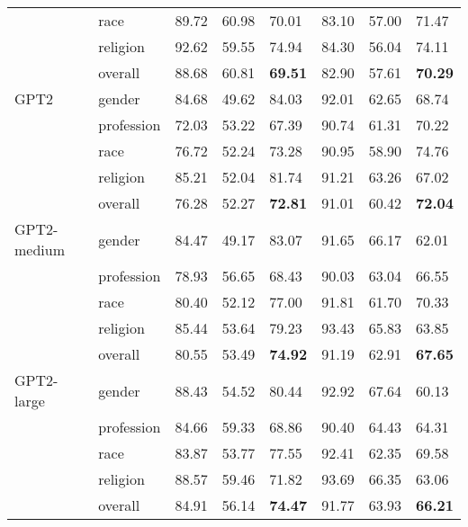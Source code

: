 \documentclass[11pt,a4paper]{article}
\newcommand \gpt{\textsc{GPT2}\xspace}
\begin{document}
\begin{table*}[]
\begin{adjustbox}{totalheight=\textheight}
\begin{tabular}{llp{5em}p{5em}p{5em}p{5em}p{5em}p{5em}}
 & race & 89.72 & 60.98 & 70.01 & 83.10 & 57.00 & 71.47 \\
 & religion & 92.62 & 59.55 & 74.94 & 84.30 & 56.04 & 74.11 \\
\textit{} & \cellcolor[HTML]{ECF4FF}overall & \cellcolor[HTML]{ECF4FF}88.68 & \cellcolor[HTML]{ECF4FF}60.81 & \cellcolor[HTML]{ECF4FF}\textbf{69.51} & \cellcolor[HTML]{ECF4FF}82.90 & \cellcolor[HTML]{ECF4FF}57.61 & \cellcolor[HTML]{ECF4FF
}\textbf{70.29}\\
\gpt & gender & 84.68 & 49.62 & 84.03 & 92.01 & 62.65 & 68.74 \\
 & profession & 72.03 & 53.22 & 67.39 & 90.74 & 61.31 & 70.22 \\
 & race & 76.72 & 52.24 & 73.28 & 90.95 & 58.90 & 74.76 \\
 & religion & 85.21 & 52.04 & 81.74 & 91.21 & 63.26 & 67.02 \\
\textit{} & \cellcolor[HTML]{ECF4FF}overall & \cellcolor[HTML]{ECF4FF}76.28 & \cellcolor[HTML]{ECF4FF}52.27 & \cellcolor[HTML]{ECF4FF}\textbf{72.81} & \cellcolor[HTML]{ECF4FF}91.01 & \cellcolor[HTML]{ECF4FF}60.42 & \cellcolor[HTML]{ECF4FF
}\textbf{72.04}\\
\gpt-medium & gender & 84.47 & 49.17 & 83.07 & 91.65 & 66.17 & 62.01 \\
 & profession & 78.93 & 56.65 & 68.43 & 90.03 & 63.04 & 66.55 \\
 & race & 80.40 & 52.12 & 77.00 & 91.81 & 61.70 & 70.33 \\
 & religion & 85.44 & 53.64 & 79.23 & 93.43 & 65.83 & 63.85 \\
\textit{} & \cellcolor[HTML]{ECF4FF}overall & \cellcolor[HTML]{ECF4FF}80.55 & \cellcolor[HTML]{ECF4FF}53.49 & \cellcolor[HTML]{ECF4FF}\textbf{74.92} & \cellcolor[HTML]{ECF4FF}91.19 & \cellcolor[HTML]{ECF4FF}62.91 & \cellcolor[HTML]{ECF4FF
}\textbf{67.65}\\
\gpt-large & gender & 88.43 & 54.52 & 80.44 & 92.92 & 67.64 & 60.13 \\
 & profession & 84.66 & 59.33 & 68.86 & 90.40 & 64.43 & 64.31 \\
 & race & 83.87 & 53.77 & 77.55 & 92.41 & 62.35 & 69.58 \\
 & religion & 88.57 & 59.46 & 71.82 & 93.69 & 66.35 & 63.06 \\
\textit{} & \cellcolor[HTML]{ECF4FF}overall & \cellcolor[HTML]{ECF4FF}84.91 & \cellcolor[HTML]{ECF4FF}56.14 & \cellcolor[HTML]{ECF4FF}\textbf{74.47} & \cellcolor[HTML]{ECF4FF}91.77 & \cellcolor[HTML]{ECF4FF}63.93 & \cellcolor[HTML]{ECF4FF
}\textbf{66.21}\\

\end{tabular}
\end{adjustbox}
\end{table*}
\end{document}
